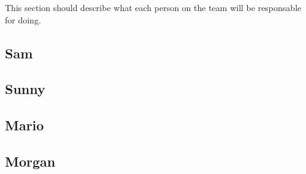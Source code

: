 This section should describe what each person on the team will be responsable
for doing.

\subsection{Sam}

\subsection{Sunny}

\subsection{Mario}

\subsection{Morgan}


